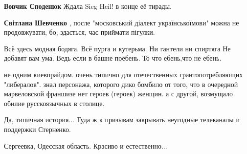 \begin{itemize}
\begin{itemize}
\textbf{Вовчик Споденюк} Ждала Sieg Heil! в конце её тирады.

 
\textbf{Світлана Шевченко} , после "московський діалект українськоїмови" можна не продовжувати, бо, здається, час приймати пігулки.

\end{itemize}

 

\obeycr
Всё здесь модная бодяга.
Всё пурга и кутерьма.
Ни гантели ни спиртяга
Не добавят вам ума.
Ведь если в башне поебень.
То что ебень,что не ебень.
\restorecr

 

не одним киевпрайдом. очень типично для отечественных грантопотребляющих
"либералов". знал персонажа, которого дико бомбило от того, что в очередной
марвеловской франшизе нет героев (героек) женщин. а с другой, возмущало обилие
русскоязычных в столице.


 
Да, типичная история... Туда ж к призывам закрывать неугодные телеканалы и поддержки Стерненко.

 
Сергеевка, Одесская область. Красиво и естественно...


\end{itemize}
